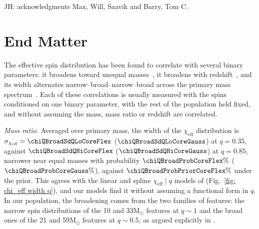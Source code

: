 \documentclass[%
    aps,
    prl,
    reprint,
    superscriptaddress,
    nolongbibliography,
    nobibnotes,
    nofootinbib,
    linenumbers,
    amsmath,amssymb,
]{revtex4-2}
\newcommand{\Msun}{\ensuremath{\mathrm{M}_{\odot}}}
\newcommand{\chieff}{\ensuremath{\chi_{\mathrm{eff}}}}
\newcommand{\jh}[1]{{\color{orange}JH: #1}}
\newcommand{\featTen}{10\xspace}
\newcommand{\featTwenty}{21\xspace}
\newcommand{\featThirtyFive}{33\xspace}
\newcommand{\featSixty}{59\xspace}
\begin{document}
\begin{acknowledgments}
\jh{acknowledgments} Max, Will, Saavik and Barry, Tom C.
\end{acknowledgments}

\newpage

\quad 

\newpage

\section*{End Matter}

The effective spin distribution has been found to correlate with several binary parameters: it broadens toward unequal masses~\cite{Callister:2021fpo, Adamcewicz:2022hce, Heinzel:2023hlb, LIGOScientific:2026ctl}, it broadens with redshift~\cite{Biscoveanu:2022qac, Heinzel:2023hlb}, and its width alternates narrow--broad--narrow--broad across the primary mass spectrum~\cite{Plunkett:2026pxt, Antonini:2025ilj, Tong:2025xir, Alvarez-Lopez:2026ymo}. Each of these correlations is usually measured with the spins conditioned on one binary parameter, with the rest of the population held fixed, and without assuming the mass, mass ratio or redshift are correlated. 


\textit{Mass ratio.} Averaged over primary mass, the width of the $\chieff$ distribution is $\sigma_{\chieff} = \chiQBroadSdQLoCoreFlex$ ($\chiQBroadSdQLoCoreGauss$) at $q = 0.35$, against $\chiQBroadSdQHiCoreFlex$ ($\chiQBroadSdQHiCoreGauss$) at $q = 0.85$, narrower near equal masses with probability $\chiQBroadProbCoreFlex\%$ ($\chiQBroadProbCoreGauss\%$), against $\chiQBroadProbPriorCoreFlex\%$ under the prior. This agrees with the linear and spline $\chieff \mid q$ models of \citet{LIGOScientific:2026ctl} (Fig.~\ref{fig: chi_eff width q}), and our models find it without assuming a functional form in $q$. In our population, the broadening comes from the two families of features: the narrow spin distributions of the \featTen and \featThirtyFive $\Msun$ features at $q \sim 1$ and the broad ones of the \featTwenty and \featSixty $\Msun$ features at $q \sim 0.5$, as argued explicitly in \citet{Vijaykumar:2026zjy}.
\end{document}
